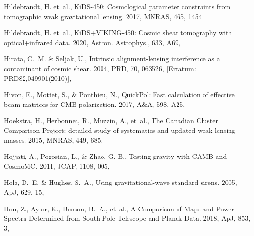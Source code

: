 \documentclass[longauth,traditabstract]{aa}
\def\aap{{A\&A}}
\def\apj{{ApJ}}
\def\mnras{{MNRAS}}
\def\prd{{PRD}}
\def\jcap{{JCAP}}
\begin{document}
\begin{thebibliography}{379}
Hildebrandt, H. {et~al.}, {KiDS-450: Cosmological parameter constraints from
  tomographic weak gravitational lensing}. 2017, \mnras, 465, 1454,

Hildebrandt, H. {et~al.}, {KiDS+VIKING-450: Cosmic shear tomography with
  optical+infrared data}. 2020, Astron. Astrophys., 633, A69,

Hirata, C.~M. \& Seljak, U., {Intrinsic alignment-lensing interference as a
  contaminant of cosmic shear}. 2004, \prd, 70, 063526, [Erratum:
  PRD82,049901(2010)], 

{Hivon}, E., {Mottet}, S., \& {Ponthieu}, N., {QuickPol: Fast calculation of
  effective beam matrices for CMB polarization}. 2017, \aap, 598, A25,

{Hoekstra}, H., {Herbonnet}, R., {Muzzin}, A., {et~al.}, {The Canadian Cluster
  Comparison Project: detailed study of systematics and updated weak lensing
  masses}. 2015, \mnras, 449, 685, 

Hojjati, A., Pogosian, L., \& Zhao, G.-B., {Testing gravity with CAMB and
  CosmoMC}. 2011, \jcap, 1108, 005, 

Holz, D.~E. \& Hughes, S.~A., {Using gravitational-wave standard sirens}. 2005,
  \apj, 629, 15, 

{Hou}, Z., {Aylor}, K., {Benson}, B.~A., {et~al.}, {A Comparison of Maps and
  Power Spectra Determined from South Pole Telescope and Planck Data}. 2018,
  \apj, 853, 3, 


\end{thebibliography}
\end{document}
